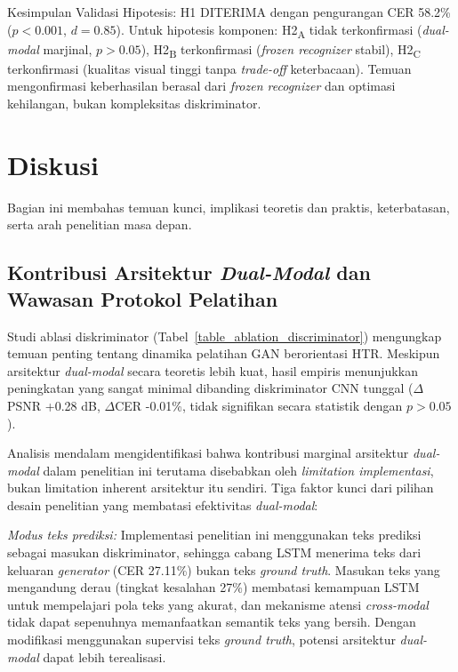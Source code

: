 \documentclass[journal]{IEEEtran}
\begin{document}
Kesimpulan Validasi Hipotesis: H1 DITERIMA dengan pengurangan CER 58.2\% ($p<0.001$, $d=0.85$). Untuk hipotesis komponen: H2\textsubscript{A} tidak terkonfirmasi (\textit{dual-modal} marjinal, $p>0.05$), H2\textsubscript{B} terkonfirmasi (\textit{frozen recognizer} stabil), H2\textsubscript{C} terkonfirmasi (kualitas visual tinggi tanpa \textit{trade-off} keterbacaan). Temuan mengonfirmasi keberhasilan berasal dari \textit{frozen recognizer} dan optimasi kehilangan, bukan kompleksitas diskriminator.

\section{Diskusi}

Bagian ini membahas temuan kunci, implikasi teoretis dan praktis, keterbatasan, serta arah penelitian masa depan.

\subsection{Kontribusi Arsitektur \textit{Dual-Modal} dan Wawasan Protokol Pelatihan}

Studi ablasi diskriminator (Tabel~\ref{table_ablation_discriminator}) mengungkap temuan penting tentang dinamika pelatihan GAN berorientasi HTR. Meskipun arsitektur \textit{dual-modal} secara teoretis lebih kuat, hasil empiris menunjukkan peningkatan yang sangat minimal dibanding diskriminator CNN tunggal ($\Delta$PSNR +0.28 dB, $\Delta$CER -0.01\%, tidak signifikan secara statistik dengan $p > 0.05$). 

Analisis mendalam mengidentifikasi bahwa kontribusi marginal arsitektur \textit{dual-modal} dalam penelitian ini terutama disebabkan oleh \textit{limitation implementasi}, bukan limitation inherent arsitektur itu sendiri. Tiga faktor kunci dari pilihan desain penelitian yang membatasi efektivitas \textit{dual-modal}:

\textit{Modus teks prediksi:} Implementasi penelitian ini menggunakan teks prediksi sebagai masukan diskriminator, sehingga cabang LSTM menerima teks dari keluaran \textit{generator} (CER 27.11\%) bukan teks \textit{ground truth}. Masukan teks yang mengandung derau (tingkat kesalahan 27\%) membatasi kemampuan LSTM untuk mempelajari pola teks yang akurat, dan mekanisme atensi \textit{cross-modal} tidak dapat sepenuhnya memanfaatkan semantik teks yang bersih. Dengan modifikasi menggunakan supervisi teks \textit{ground truth}, potensi arsitektur \textit{dual-modal} dapat lebih terealisasi.
\end{document}
